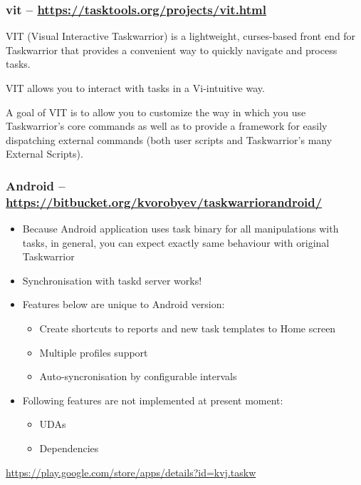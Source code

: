 \documentclass[t,handout,aspectratio=169]{beamer}
\begin{document}
\begin{frame}[fragile]\frametitle{vit -- \url{https://tasktools.org/projects/vit.html}}
    \vfill
    VIT (Visual Interactive Taskwarrior) is a lightweight, curses-based front end for Taskwarrior that provides a convenient way to quickly navigate and process tasks.

    VIT allows you to interact with tasks in a Vi-intuitive way.

    A goal of VIT is to allow you to customize the way in which you use Taskwarrior's core commands as well as to provide a framework for easily dispatching external commands (both user scripts and Taskwarrior's many External Scripts).
\end{frame}

\begin{frame}[fragile]\frametitle{Android -- \url{https://bitbucket.org/kvorobyev/taskwarriorandroid/}}
    \vfill
    \begin{itemize}
        \item Because Android application uses task binary for all manipulations with tasks, in general, you can expect exactly same behaviour with original Taskwarrior
        \item Synchronisation with taskd server works!
        \item Features below are unique to Android version:
        \begin{itemize}
            \item Create shortcuts to reports and new task templates to Home screen
            \item Multiple profiles support
            \item Auto-syncronisation by configurable intervals
        \end{itemize}
        \item Following features are not implemented at present moment:
        \begin{itemize}
            \item UDAs
            \item Dependencies
        \end{itemize}
    \end{itemize}
    \url{https://play.google.com/store/apps/details?id=kvj.taskw}
\end{frame}
\end{document}
